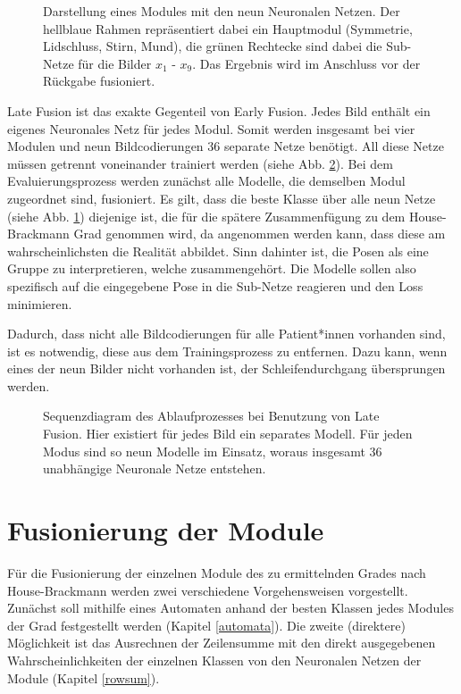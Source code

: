 \begin{figure}[b]
\begin{tikzpicture}[->,>=stealth',shorten >=1pt,auto,node distance=2.5cm,semithick]
\end{tikzpicture}
\caption[Darstellung eines Modules mit den neun Neuronalen Netzen]{Darstellung eines Modules mit den neun Neuronalen Netzen. Der hellblaue Rahmen repräsentiert dabei ein Hauptmodul (Symmetrie, Lidschluss, Stirn, Mund), die grünen Rechtecke sind dabei die Sub-Netze für die Bilder $x_1$ - $x_9$. Das Ergebnis wird im Anschluss vor der Rückgabe fusioniert.}\label{cap:mod_lf}
\end{figure}\label{fig:mod_lf}


Late Fusion ist das exakte Gegenteil von Early Fusion. Jedes Bild enthält ein eigenes Neuronales Netz für jedes Modul. Somit werden insgesamt bei vier Modulen und neun Bildcodierungen 36 separate Netze benötigt. All diese Netze müssen getrennt voneinander trainiert werden (siehe Abb. \ref{cap:late}). Bei dem Evaluierungsprozess werden zunächst alle Modelle, die demselben Modul zugeordnet sind, fusioniert. Es gilt, dass die beste Klasse über alle neun Netze (siehe Abb. \ref{cap:mod_lf}) diejenige ist, die für die spätere Zusammenfügung zu dem House-Brackmann Grad genommen wird, da angenommen werden kann, dass diese am wahrscheinlichsten die Realität abbildet. Sinn dahinter ist, die Posen als eine Gruppe zu interpretieren, welche zusammengehört. Die Modelle sollen also spezifisch auf die eingegebene Pose in die Sub-Netze reagieren und den Loss minimieren.

Dadurch, dass nicht alle Bildcodierungen für alle Patient*innen vorhanden sind, ist es notwendig, diese aus dem Trainingsprozess zu entfernen. Dazu kann, wenn eines der neun Bilder nicht vorhanden ist, der Schleifendurchgang übersprungen werden.



\begin{figure}[!t]\centering
\makebox[0pt]{}
\caption[Sequenzdiagram des Ablaufprozesses bei Benutzung von Late Fusion]{Sequenzdiagram des Ablaufprozesses bei Benutzung von Late Fusion. Hier existiert für jedes Bild ein separates Modell. Für jeden Modus sind so neun Modelle im Einsatz, woraus insgesamt 36 unabhängige Neuronale Netze entstehen.}\label{cap:late}
\end{figure}\label{fig:late}





\clearpage
\section{Fusionierung der Module}\label{fusion}
Für die Fusionierung der einzelnen Module des zu ermittelnden Grades nach House-Brackmann werden zwei verschiedene Vorgehensweisen vorgestellt. Zunächst soll mithilfe eines Automaten anhand der besten Klassen jedes Modules der Grad festgestellt werden (Kapitel \ref{automata}). Die zweite (direktere) Möglichkeit ist das Ausrechnen der Zeilensumme mit den direkt ausgegebenen Wahrscheinlichkeiten der einzelnen Klassen von den Neuronalen Netzen der Module (Kapitel \ref{rowsum}).

